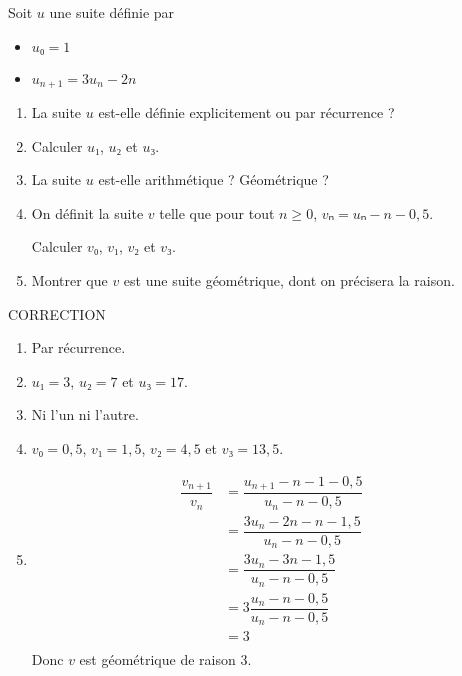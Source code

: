 \documentclass{automatisme}
\begin{document}
\begin{frame}
	Soit $u$ une suite définie par
	\begin{itemize}
		\item $u₀ = 1$
		\item $u_{n+1} = 3u_n - 2n$
	\end{itemize}
	\begin{enumerate}
		\item La suite $u$ est-elle définie explicitement ou par récurrence ?
		\item Calculer $u₁$, $u₂$ et $u₃$.
		\item La suite $u$ est-elle arithmétique ? Géométrique ?
		\item On définit la suite $v$ telle que pour tout $n ≥ 0$, $vₙ = uₙ - n - 0,5$.

		      Calculer $v₀$, $v₁$, $v₂$ et $v₃$.
		\item Montrer que $v$ est une suite géométrique, dont on précisera la raison.
	\end{enumerate}
\end{frame}

\begin{frame}
	CORRECTION

	\begin{enumerate}
		\item Par récurrence.
		\item $u₁ = 3$, $u₂ = 7$ et $u₃ = 17$.
		\item Ni l'un ni l'autre.
		\item $v₀ = 0,5$, $v₁ = 1,5$, $v₂ = 4,5$ et $v₃ = 13,5$.
		\item \begin{align*}
			      \dfrac{v_{n+1}}{v_n} & = \dfrac{u_{n+1} - n - 1 - 0,5}{u_n - n - 0,5} \\
			                           & = \dfrac{3u_n - 2n - n - 1,5}{u_n - n - 0,5}   \\
			                           & = \dfrac{3u_n - 3n - 1,5}{u_n - n - 0,5}       \\
			                           & = 3\dfrac{u_n - n - 0,5}{u_n - n - 0,5}        \\
			                           & = 3                                            \\
		      \end{align*}
		      Donc $v$ est géométrique de raison $3$.
	\end{enumerate}
\end{frame}
\end{document}
